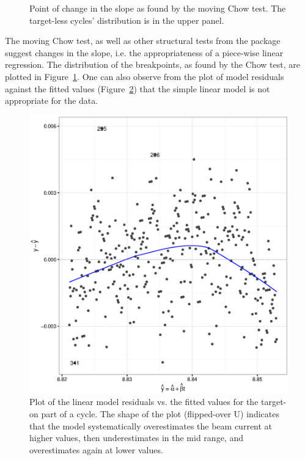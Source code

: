 \documentclass{report}
\begin{document}
\begin{figure}[h]
\begin{minipage}{.5\textwidth}
		\caption{Point of change in the slope as found by the moving Chow test. The target-less cycles' distribution is in the upper panel.\label{FStat_BP_dens}}
	\end{minipage}
\end{figure}

The moving Chow test, as well as other structural tests from the package~\cite{RStrucchange} suggest changes in the slope, i.e. the appropriateness of a piece-wise linear regression. The distribution of the breakpoints, as found by the Chow test, are plotted in Figure~\ref{FStat_BP_dens}. One can also observe from the plot of model residuals against the fitted values (Figure~\ref{fig:RvF-u17}) that the simple linear model is not appropriate for the data.

	\begin{figure}[H]
		\centering
		\includegraphics[scale=1]{Res_VS_Fit_2016-17.eps}
		\caption{Plot of the linear model residuals vs. the fitted values for the target-on part of a cycle. The shape of the plot (flipped-over U) indicates that the model systematically overestimates the beam current at higher values, then underestimates in the mid range, and overestimates again at lower values.\label{fig:RvF-u17}}
	\end{figure}
\end{document}
